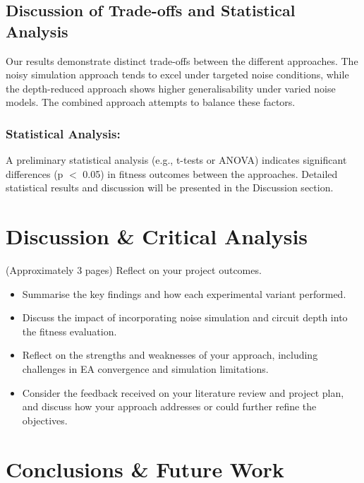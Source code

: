 \documentclass[11pt,a4paper]{article}
\begin{document}
\subsection{Discussion of Trade-offs and Statistical Analysis}
Our results demonstrate distinct trade-offs between the different approaches. The noisy simulation approach tends to excel under targeted noise conditions, while the depth-reduced approach shows higher generalisability under varied noise models. The combined approach attempts to balance these factors.

\subsubsection*{Statistical Analysis:}  
A preliminary statistical analysis (e.g., t-tests or ANOVA) indicates significant differences (p $<$ 0.05) in fitness outcomes between the approaches. Detailed statistical results and discussion will be presented in the Discussion section.

%
%
\section{Discussion \& Critical Analysis}

(Approximately 3 pages) Reflect on your project outcomes.

\begin{itemize}
    \item Summarise the key findings and how each experimental variant performed.
    \item Discuss the impact of incorporating noise simulation and circuit depth into the fitness evaluation.
    \item Reflect on the strengths and weaknesses of your approach, including challenges in EA convergence and simulation limitations.
    \item Consider the feedback received on your literature review and project plan, and discuss how your approach addresses or could further refine the objectives.
\end{itemize}

%
%
\section{Conclusions \& Future Work}
\end{document}
